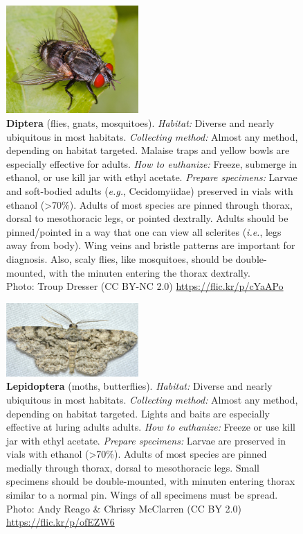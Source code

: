 \documentclass[letterpaper, 11pt]{article}
\begin{document}
\begin{figure}
  \caption{\textbf{Diptera} (flies, gnats, mosquitoes). \textit{Habitat:} Diverse and nearly ubiquitous in most habitats. \textit{Collecting method:} Almost any method, depending on habitat targeted. Malaise traps and yellow bowls are especially effective for adults. \textit{How to euthanize:} Freeze, submerge in ethanol, or use kill jar with ethyl acetate. \textit{Prepare specimens:} Larvae and soft-bodied adults (\textit{e.g.}, Cecidomyiidae) preserved in vials with ethanol (\textgreater70\%). Adults of most species are pinned through thorax, dorsal to mesothoracic legs, or pointed dextrally. Adults should be pinned/pointed in a way that one can view all sclerites (\textit{i.e.}, legs away from body). Wing veins and bristle patterns are important for diagnosis. Also, scaly flies, like mosquitoes, should be double-mounted, with the minuten entering the thorax dextrally.\\ Photo: Troup Dresser (CC BY-NC 2.0) \url{https://flic.kr/p/cYaAPo}}
  \includegraphics[width=0.45\textwidth]{Diptera}
\end{figure}

\begin{figure}
  \caption{\textbf{Lepidoptera} (moths, butterflies). \textit{Habitat:} Diverse and nearly ubiquitous in most habitats. \textit{Collecting method:} Almost any method, depending on habitat targeted. Lights and baits are especially effective at luring adults adults. \textit{How to euthanize:} Freeze or use kill jar with ethyl acetate. \textit{Prepare specimens:} Larvae are preserved in vials with ethanol (\textgreater70\%). Adults of most species are pinned medially through thorax, dorsal to mesothoracic legs. Small specimens should be double-mounted, with minuten entering thorax similar to a normal pin. Wings of all specimens must be spread. \\ Photo: Andy Reago \& Chrissy McClarren (CC BY 2.0) \url{https://flic.kr/p/ofEZW6}}
  \includegraphics[width=0.45\textwidth]{Lepidoptera}
\end{figure}
\end{document}
